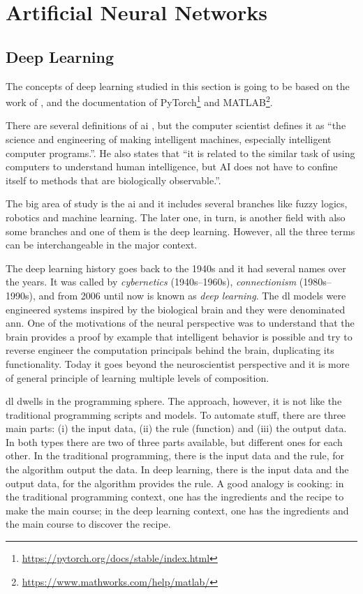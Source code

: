\section{Artificial Neural Networks}\label{sec:ann}

\subsection{Deep Learning}\label{sec:deep_learning}

The concepts of deep learning studied in this section is going to be based on the work of \citet{goodfellow2016}, \citet{haykin1999} and the documentation of PyTorch\footnote{\url{https://pytorch.org/docs/stable/index.html}} and MATLAB\footnote{\url{https://www.mathworks.com/help/matlab/}}.

There are several definitions of \gls*{ai} \citep{winston1992}, but the  computer scientist \citet{mccarthy2007} defines it as ``the science and engineering of making intelligent machines, especially intelligent computer programs.''.
He also states that ``it is related to the similar task of using computers to understand human intelligence, but AI does not have to confine itself to methods that are biologically observable.''.

The big area of study is the \gls*{ai} and it includes several branches like fuzzy logics, robotics and machine learning.
The later one, in turn, is another field with also some branches and one of them is the deep learning.
However, all the three terms can be interchangeable in the major context.

The deep learning history goes back to the 1940s and it had several names over the years. 
It was called by \emph{cybernetics} (1940s--1960s), \emph{connectionism} (1980s--1990s), and from 2006 until now is known as \emph{deep learning}.
The \gls*{dl} models were engineered systems inspired by the biological brain and they were denominated \gls*{ann}.
One of the motivations of the neural  perspective was to understand that the brain provides a proof by example that intelligent behavior is possible and try to reverse engineer the computation principals behind the brain, duplicating its functionality.
Today it goes beyond the neuroscientist perspective and it is more of general principle of learning multiple levels of composition.

\gls*{dl} dwells in the programming sphere. The approach, however, it is not like the traditional programming scripts and models. To automate stuff, there are three main parts: (i) the input data, (ii) the rule (function) and (iii) the output data. In both types there are two of three parts available, but different ones for each other. In the traditional programming, there is the input data and the rule, for the algorithm output the data. In deep learning, there is the input data and the output data, for the algorithm provides the rule. A good analogy is cooking: in the traditional programming context, one has the ingredients and the recipe to make the main course; in the deep learning context, one has the ingredients and the main course to discover the recipe.

